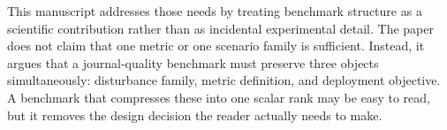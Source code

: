 This manuscript addresses those needs by treating benchmark structure as a scientific contribution rather than as incidental experimental detail. The paper does not claim that one metric or one scenario family is sufficient. Instead, it argues that a journal-quality benchmark must preserve three objects simultaneously: disturbance family, metric definition, and deployment objective. A benchmark that compresses these into one scalar rank may be easy to read, but it removes the design decision the reader actually needs to make.
